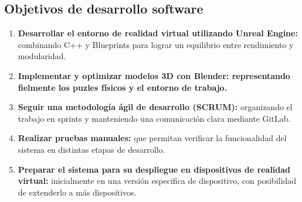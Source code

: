 \subsection{Objetivos de desarrollo software}
\label{Objetivos de desarrollo}
\begin{enumerate}
    \item \textbf{Desarrollar el entorno de realidad virtual utilizando Unreal Engine:} combinando C++ y Blueprints para lograr un equilibrio entre rendimiento y modularidad.
    
    \item \textbf{Implementar y optimizar modelos 3D con Blender: representando fielmente los puzles físicos y el entorno de trabajo.}
    
    \item \textbf{Seguir una metodología ágil de desarrollo (SCRUM):} organizando el trabajo en sprints y manteniendo una comunicación clara mediante GitLab.
    
    \item \textbf{Realizar pruebas manuales:} que permitan verificar la funcionalidad del sistema en distintas etapas de desarrollo.
    
    \item \textbf{Preparar el sistema para su despliegue en dispositivos de realidad virtual:} inicialmente en una versión especifica de dispositivo, con posibilidad de extenderlo a más dispositivos.
\end{enumerate}